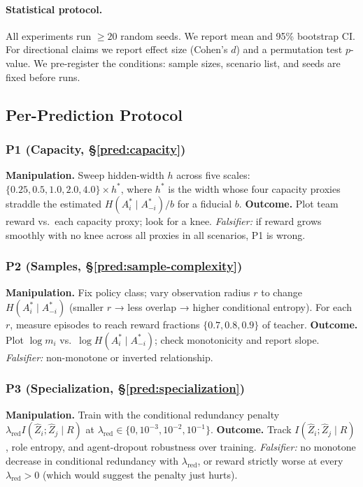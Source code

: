 \documentclass[10pt, letterpaper]{article}
\begin{document}
\paragraph{Statistical protocol.} All experiments run $\geq 20$ random seeds. We report mean and 95\% bootstrap CI. For directional claims we report effect size (Cohen's $d$) and a permutation test $p$-value. We pre-register the conditions: sample sizes, scenario list, and seeds are fixed before runs.

\subsection{Per-Prediction Protocol}

\subsubsection*{P1 (Capacity, \S\ref{pred:capacity})}
\textbf{Manipulation.} Sweep hidden-width $h$ across five scales: $\{0.25, 0.5, 1.0, 2.0, 4.0\}\times h^*$, where $h^*$ is the width whose four capacity proxies straddle the estimated $H(A_i^*\mid A_{-i}^*)/b$ for a fiducial $b$.
\textbf{Outcome.} Plot team reward vs.\ each capacity proxy; look for a knee. \emph{Falsifier:} if reward grows smoothly with no knee across all proxies in all scenarios, P1 is wrong.

\subsubsection*{P2 (Samples, \S\ref{pred:sample-complexity})}
\textbf{Manipulation.} Fix policy class; vary observation radius $r$ to change $H(A_i^*\mid A_{-i}^*)$ (smaller $r$ → less overlap → higher conditional entropy). For each $r$, measure episodes to reach reward fractions $\{0.7, 0.8, 0.9\}$ of teacher.
\textbf{Outcome.} Plot $\log m_i$ vs.\ $\log H(A_i^*\mid A_{-i}^*)$; check monotonicity and report slope. \emph{Falsifier:} non-monotone or inverted relationship.

\subsubsection*{P3 (Specialization, \S\ref{pred:specialization})}
\textbf{Manipulation.} Train with the conditional redundancy penalty $\lambda_\text{red} I(\hat{Z}_i; \hat{Z}_j \mid R)$ at $\lambda_\text{red} \in \{0, 10^{-3}, 10^{-2}, 10^{-1}\}$.
\textbf{Outcome.} Track $I(\hat{Z}_i; \hat{Z}_j \mid R)$, role entropy, and agent-dropout robustness over training. \emph{Falsifier:} no monotone decrease in conditional redundancy with $\lambda_\text{red}$, or reward strictly worse at every $\lambda_\text{red} > 0$ (which would suggest the penalty just hurts).
\end{document}
